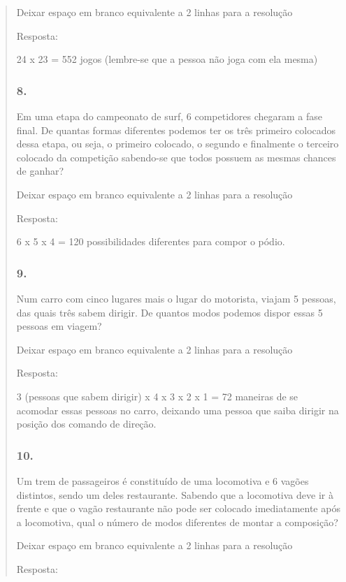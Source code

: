 \begin{enumerate}
\begin{escolha}
\begin{enumerate}
\begin{itemize}
\begin{itemize}
\begin{escolha}
\begin{quote}
\begin{escolha}
{Deixar espaço em branco equivalente a 2 linhas para a resolução

Resposta:

24 x 23 = 552 jogos (lembre-se que a pessoa não joga com ela mesma)

\subsubsection{8.}\label{section-137}

Em uma etapa do campeonato de surf, 6 competidores chegaram a fase
final. De quantas formas diferentes podemos ter os três primeiro
colocados dessa etapa, ou seja, o primeiro colocado, o segundo e
finalmente o terceiro colocado da competição sabendo-se que todos
possuem as mesmas chances de ganhar?

Deixar espaço em branco equivalente a 2 linhas para a resolução

Resposta:

6 x 5 x 4 = 120 possibilidades diferentes para compor o pódio.

\subsubsection{9.}\label{section-138}

Num carro com cinco lugares mais o lugar do motorista, viajam 5 pessoas,
das quais três sabem dirigir. De quantos modos podemos dispor essas 5
pessoas em viagem?

Deixar espaço em branco equivalente a 2 linhas para a resolução

Resposta:

3 (pessoas que sabem dirigir) x 4 x 3 x 2 x 1 = 72 maneiras de se
acomodar essas pessoas no carro, deixando uma pessoa que saiba dirigir
na posição dos comando de direção.

\subsubsection{10.}\label{section-139}

Um trem de passageiros é constituído de uma locomotiva e 6 vagões
distintos, sendo um deles restaurante. Sabendo que a locomotiva deve ir
à frente e que o vagão restaurante não pode ser colocado imediatamente
após a locomotiva, qual o número de modos diferentes de montar a
composição?

Deixar espaço em branco equivalente a 2 linhas para a resolução

Resposta:

}
\end{escolha}
\end{quote}
\end{escolha}
\end{itemize}
\end{itemize}
\end{enumerate}
\end{escolha}
\end{enumerate}
